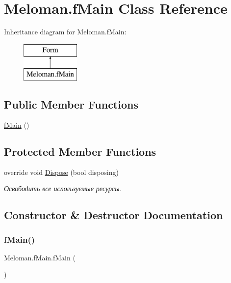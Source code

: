 \hypertarget{class_meloman_1_1f_main}{}\section{Meloman.\+f\+Main Class Reference}
\label{class_meloman_1_1f_main}
Inheritance diagram for Meloman.\+f\+Main\+:\begin{figure}[H]
\begin{center}
\leavevmode
\includegraphics[height=2.000000cm]{class_meloman_1_1f_main}
\end{center}
\end{figure}
\subsection*{Public Member Functions}
\begin{DoxyCompactItemize}
\item 
\mbox{\hyperlink{class_meloman_1_1f_main_a3a54eefc93a957679115fc14c49f02e9}{f\+Main}} ()
\end{DoxyCompactItemize}
\subsection*{Protected Member Functions}
\begin{DoxyCompactItemize}
\item 
override void \mbox{\hyperlink{class_meloman_1_1f_main_aee2339b14f1f64b2c140a40b234cd0b0}{Dispose}} (bool disposing)
\begin{DoxyCompactList}\small\item\em Освободить все используемые ресурсы. \end{DoxyCompactList}\end{DoxyCompactItemize}


\subsection{Constructor \& Destructor Documentation}
\mbox{\label{class_meloman_1_1f_main_a3a54eefc93a957679115fc14c49f02e9}} 
\subsubsection{\texorpdfstring{fMain()}{fMain()}}
{\footnotesize\ttfamily Meloman.\+f\+Main.\+f\+Main (\begin{DoxyParamCaption}{ }\end{DoxyParamCaption})}



